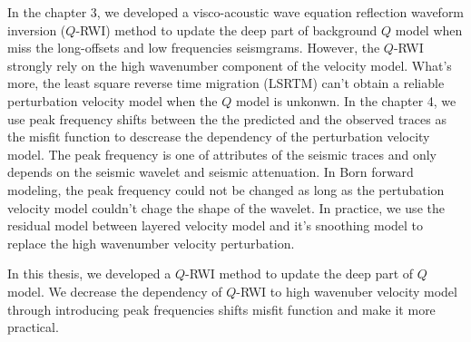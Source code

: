 \begin{englishabstract}
In the chapter 3, we developed a visco-acoustic wave equation reflection waveform 
inversion ($Q$-RWI) method to update the deep part of background $Q$ model when 
miss the long-offsets and low frequencies seismgrams. However, the $Q$-RWI strongly 
rely on the high wavenumber component of the velocity model. What's more, 
the least square reverse time migration (LSRTM) can't obtain a reliable perturbation 
velocity model when the $Q$ model is unkonwn. In the chapter 4, we use peak frequency 
shifts between the the predicted and the observed traces as the misfit function 
to descrease the dependency of the perturbation velocity model. The peak frequency 
is one of attributes of the seismic traces and only depends on the seismic wavelet 
and seismic attenuation. In Born forward modeling, the peak frequency could not be
changed as long as the pertubation velocity model couldn't chage the shape of the 
wavelet. In practice, we use the residual model between layered velocity model and it's 
snoothing model to replace the high wavenumber velocity perturbation. 

In this thesis, we developed a $Q$-RWI method to update the deep part of $Q$ model.
We decrease the dependency of $Q$-RWI to high wavenuber velocity model through introducing 
peak frequencies shifts misfit function and make it more practical.


  
  
\end{englishabstract}
